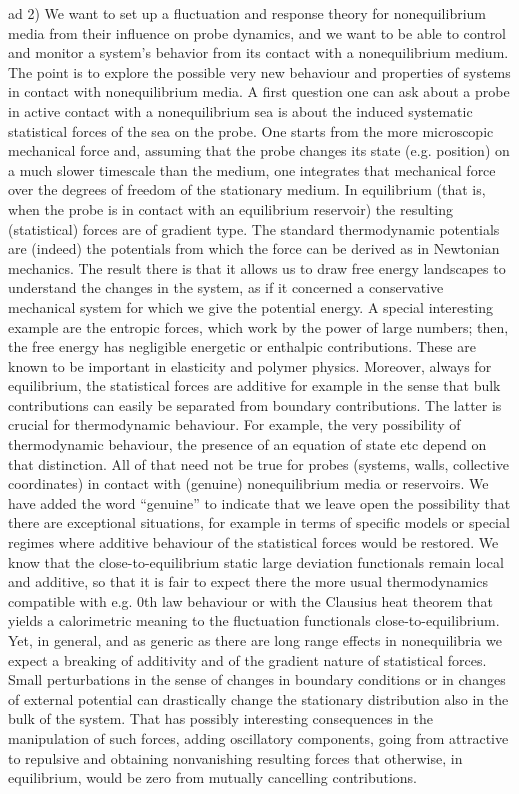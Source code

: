 ad 2) We want to set up a fluctuation and response theory for nonequilibrium media from their influence on probe  dynamics, and we want to be able to control and monitor a system’s behavior from its contact with a nonequilibrium medium. The point is to explore the possible very new behaviour and properties of systems in contact with nonequilibrium media. A first question one can ask about a probe in active contact with a nonequilibrium sea is about the induced systematic statistical forces of the sea on the probe.  One starts from the more microscopic mechanical force and, assuming that the probe changes its state (e.g. position) on a much slower timescale than the medium, one integrates that mechanical force over the degrees of freedom of the stationary medium.  In equilibrium (that is, when the probe is in contact with an equilibrium reservoir) the resulting (statistical) forces are of gradient type.  The standard thermodynamic potentials are (indeed) the potentials from which the force can be derived as in Newtonian mechanics. The result there is that it allows us to draw free energy landscapes to understand the changes in the system, as if it concerned a conservative mechanical system for which we give the potential energy.  A special interesting example are the entropic forces, which work by the power of large numbers; then, the free energy has negligible energetic or enthalpic contributions.  These are known to be important in elasticity and polymer physics. Moreover, always for equilibrium, the statistical forces are additive for example in the sense that bulk contributions can easily be separated from boundary contributions.  The latter is crucial for thermodynamic behaviour.  For example, the very possibility of thermodynamic behaviour, the presence of an equation of state etc depend on that distinction.  All of that need not be true for probes (systems, walls, collective coordinates) in contact with (genuine) nonequilibrium media or reservoirs.  We have added the word “genuine” to indicate that we leave open the possibility that there are exceptional situations, for example in terms of specific models or special regimes where additive behaviour of the statistical forces would be restored.  We know that the close-to-equilibrium static large deviation functionals remain local and additive, so that it is fair to expect there the more usual thermodynamics compatible with e.g. 0th law behaviour or with the Clausius heat theorem that yields a calorimetric meaning to the fluctuation functionals close-to-equilibrium.   Yet, in general, and as generic as there are long range effects in nonequilibria we expect a breaking of additivity and of the gradient nature of statistical forces. Small perturbations in the sense of changes in boundary conditions or in changes of external potential can drastically change the stationary distribution also in the bulk of the system.  That has possibly interesting consequences in the manipulation of such forces, adding oscillatory components, going from attractive to repulsive and obtaining nonvanishing resulting forces that otherwise, in equilibrium, would be zero from mutually cancelling contributions. 
